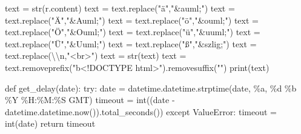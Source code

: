 \documentclass[
  letterpaper,
]{book}
\newenvironment{Shaded}{\begin{snugshade}}{\end{snugshade}}
\newcommand{\BuiltInTok}[1]{\textcolor[rgb]{0.00,0.23,0.31}{#1}}
\newcommand{\CharTok}[1]{\textcolor[rgb]{0.13,0.47,0.30}{#1}}
\newcommand{\ControlFlowTok}[1]{\textcolor[rgb]{0.00,0.23,0.31}{#1}}
\newcommand{\KeywordTok}[1]{\textcolor[rgb]{0.00,0.23,0.31}{#1}}
\newcommand{\NormalTok}[1]{\textcolor[rgb]{0.00,0.23,0.31}{#1}}
\newcommand{\OperatorTok}[1]{\textcolor[rgb]{0.37,0.37,0.37}{#1}}
\newcommand{\PreprocessorTok}[1]{\textcolor[rgb]{0.68,0.00,0.00}{#1}}
\newcommand{\SpecialCharTok}[1]{\textcolor[rgb]{0.37,0.37,0.37}{#1}}
\newcommand{\StringTok}[1]{\textcolor[rgb]{0.13,0.47,0.30}{#1}}
\begin{document}
\begin{Shaded}
\begin{Highlighting}[]
\NormalTok{        text }\OperatorTok{=} \BuiltInTok{str}\NormalTok{(r.content)}
\NormalTok{        text }\OperatorTok{=}\NormalTok{ text.replace(}\StringTok{"ä"}\NormalTok{,}\StringTok{"\&auml;"}\NormalTok{)}
\NormalTok{        text }\OperatorTok{=}\NormalTok{ text.replace(}\StringTok{"Ä"}\NormalTok{,}\StringTok{"\&Auml;"}\NormalTok{)}
\NormalTok{        text }\OperatorTok{=}\NormalTok{ text.replace(}\StringTok{"ö"}\NormalTok{,}\StringTok{"\&ouml;"}\NormalTok{)}
\NormalTok{        text }\OperatorTok{=}\NormalTok{ text.replace(}\StringTok{"Ö"}\NormalTok{,}\StringTok{"\&Ouml;"}\NormalTok{)}
\NormalTok{        text }\OperatorTok{=}\NormalTok{ text.replace(}\StringTok{"ü"}\NormalTok{,}\StringTok{"\&uuml;"}\NormalTok{)}
\NormalTok{        text }\OperatorTok{=}\NormalTok{ text.replace(}\StringTok{"Ü"}\NormalTok{,}\StringTok{"\&Uuml;"}\NormalTok{)}
\NormalTok{        text }\OperatorTok{=}\NormalTok{ text.replace(}\StringTok{"ß"}\NormalTok{,}\StringTok{"\&szlig;"}\NormalTok{)}
\NormalTok{        text }\OperatorTok{=}\NormalTok{ text.replace(}\StringTok{\textquotesingle{}}\CharTok{\textbackslash{}\textbackslash{}}\StringTok{n\textquotesingle{}}\NormalTok{,}\StringTok{"\textless{}br\textgreater{}"}\NormalTok{)}
\NormalTok{        text }\OperatorTok{=} \BuiltInTok{str}\NormalTok{(text)}
\NormalTok{        text }\OperatorTok{=}\NormalTok{ text.removeprefix(}\StringTok{"b\textquotesingle{}\textless{}!DOCTYPE html\textgreater{}"}\NormalTok{).removesuffix(}\StringTok{"\textquotesingle{}"}\NormalTok{)}
        \BuiltInTok{print}\NormalTok{(text)}

\KeywordTok{def}\NormalTok{ get\_delay(date):}
    \ControlFlowTok{try}\NormalTok{:}
\NormalTok{        date }\OperatorTok{=}\NormalTok{ datetime.datetime.strptime(date, }\StringTok{\textquotesingle{}\%a, }\SpecialCharTok{\%d}\StringTok{ \%b \%Y \%H:\%M:\%S GMT\textquotesingle{}}\NormalTok{)}
\NormalTok{        timeout }\OperatorTok{=} \BuiltInTok{int}\NormalTok{((date }\OperatorTok{{-}}\NormalTok{ datetime.datetime.now()).total\_seconds())}
    \ControlFlowTok{except} \PreprocessorTok{ValueError}\NormalTok{:}
\NormalTok{        timeout }\OperatorTok{=} \BuiltInTok{int}\NormalTok{(date)}
    \ControlFlowTok{return}\NormalTok{ timeout}


\end{Highlighting}
\end{Shaded}
\end{document}
